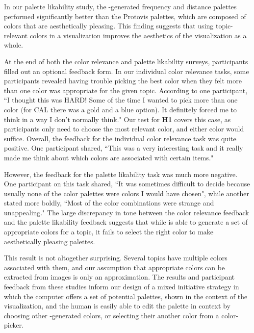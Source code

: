 In our palette likability study, the \system-generated frequency and distance palettes performed significantly better than the Protovis palettes, which are composed of colors that are aesthetically pleasing. This finding suggests that using topic-relevant colors in a visualization improves the aesthetics of the visualization as a whole. 

At the end of both the color relevance and palette likability surveys, participants filled out an optional feedback form. In our individual color relevance tasks, some participants revealed having trouble picking the best color when they felt more than one color was appropriate for the given topic. According to one participant, ``I thought this was HARD! Some of the time I wanted to pick more than one color (for CAL there was a gold and a blue option). It definitely forced me to think in a way I don't normally think." Our test for \textbf{H1} covers this case, as participants only need to choose the most relevant color, and either color would suffice. Overall, the feedback for the individual color relevance task was quite positive. One participant shared, ``This was a very interesting task and it really made me think about which colors are associated with certain items."

However, the feedback for the palette likability task was much more negative. One participant on this task shared, ``It was sometimes difficult to decide because usually none of the color palettes were colors I would have chosen", while another stated more boldly, ``Most of the color combinations were strange and unappealing." The large discrepancy in tone between the color relevance feedback and the palette likability feedback suggests that while \system is able to generate a set of appropriate colors for a topic, it fails to select the right color to make aesthetically pleasing palettes. 

This result is not altogether surprising. Several topics have multiple colors associated with them, and our assumption that appropriate colors can be extracted from images is only an approximation. The results and participant feedback from these studies inform our design of a mixed initiative strategy in which the computer offers a set of potential palettes, shown in the context of the visualization, and the human is easily able to edit the palette in context by choosing other \system-generated colors, or selecting their another color from a color-picker. 
